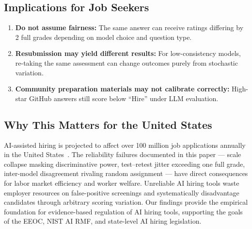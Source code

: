 \documentclass{article}
\begin{document}
\subsection{Implications for Job Seekers}
\begin{enumerate}
  \item \textbf{Do not assume fairness:} The same answer can receive ratings differing by 2 full grades depending on model choice and question type.
  \item \textbf{Resubmission may yield different results:} For low-consistency models, re-taking the same assessment can change outcomes purely from stochastic variation.
  \item \textbf{Community preparation materials may not calibrate correctly:} High-star GitHub answers still score below ``Hire'' under LLM evaluation.
\end{enumerate}

\subsection{Why This Matters for the United States}
AI-assisted hiring is projected to affect over 100 million job applications annually in the United States~\cite{levy2025}. The reliability failures documented in this paper --- scale collapse masking discriminative power, test--retest jitter exceeding one full grade, inter-model disagreement rivaling random assignment --- have direct consequences for labor market efficiency and worker welfare. Unreliable AI hiring tools waste employer resources on false-positive screenings and systematically disadvantage candidates through arbitrary scoring variation. Our findings provide the empirical foundation for evidence-based regulation of AI hiring tools, supporting the goals of the EEOC, NIST AI RMF, and state-level AI hiring legislation.
\end{document}
